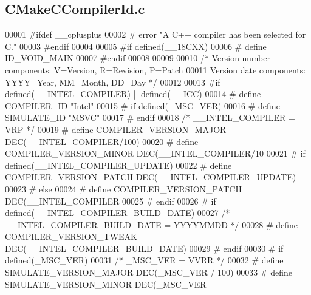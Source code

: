 \subsection{C\+Make\+C\+Compiler\+Id.\+c}
\label{soapysdr_2build_2CMakeFiles_23_85_81_2CompilerIdC_2CMakeCCompilerId_8c_source}

\begin{DoxyCode}
00001 \textcolor{preprocessor}{#ifdef \_\_cplusplus}
00002 \textcolor{preprocessor}{# error "A C++ compiler has been selected for C."}
00003 \textcolor{preprocessor}{#endif}
00004 
00005 \textcolor{preprocessor}{#if defined(\_\_18CXX)}
00006 \textcolor{preprocessor}{# define ID\_VOID\_MAIN}
00007 \textcolor{preprocessor}{#endif}
00008 
00009 
00010 \textcolor{comment}{/* Version number components: V=Version, R=Revision, P=Patch}
00011 \textcolor{comment}{   Version date components:   YYYY=Year, MM=Month,   DD=Day  */}
00012 
00013 \textcolor{preprocessor}{#if defined(\_\_INTEL\_COMPILER) || defined(\_\_ICC)}
00014 \textcolor{preprocessor}{# define COMPILER\_ID "Intel"}
00015 \textcolor{preprocessor}{# if defined(\_MSC\_VER)}
00016 \textcolor{preprocessor}{#  define SIMULATE\_ID "MSVC"}
00017 \textcolor{preprocessor}{# endif}
00018   \textcolor{comment}{/* \_\_INTEL\_COMPILER = VRP */}
00019 \textcolor{preprocessor}{# define COMPILER\_VERSION\_MAJOR DEC(\_\_INTEL\_COMPILER/100)}
00020 \textcolor{preprocessor}{# define COMPILER\_VERSION\_MINOR DEC(\_\_INTEL\_COMPILER/10 %
00021 \textcolor{preprocessor}{# if defined(\_\_INTEL\_COMPILER\_UPDATE)}
00022 \textcolor{preprocessor}{#  define COMPILER\_VERSION\_PATCH DEC(\_\_INTEL\_COMPILER\_UPDATE)}
00023 \textcolor{preprocessor}{# else}
00024 \textcolor{preprocessor}{#  define COMPILER\_VERSION\_PATCH DEC(\_\_INTEL\_COMPILER   %
00025 \textcolor{preprocessor}{# endif}
00026 \textcolor{preprocessor}{# if defined(\_\_INTEL\_COMPILER\_BUILD\_DATE)}
00027   \textcolor{comment}{/* \_\_INTEL\_COMPILER\_BUILD\_DATE = YYYYMMDD */}
00028 \textcolor{preprocessor}{#  define COMPILER\_VERSION\_TWEAK DEC(\_\_INTEL\_COMPILER\_BUILD\_DATE)}
00029 \textcolor{preprocessor}{# endif}
00030 \textcolor{preprocessor}{# if defined(\_MSC\_VER)}
00031    \textcolor{comment}{/* \_MSC\_VER = VVRR */}
00032 \textcolor{preprocessor}{#  define SIMULATE\_VERSION\_MAJOR DEC(\_MSC\_VER / 100)}
00033 \textcolor{preprocessor}{#  define SIMULATE\_VERSION\_MINOR DEC(\_MSC\_VER %
}}}
\end{DoxyCode}
